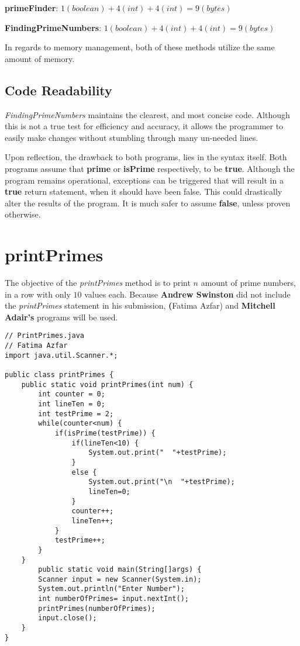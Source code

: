 \documentclass[12pt]{article}
\begin{document}
\textbf{primeFinder}: $1 (boolean)  + 4 (int) + 4 (int)  =  9(bytes)$

\textbf{FindingPrimeNumbers}: $1 (boolean) + 4 (int) + 4(int) = 9(bytes)$ 
 
 
In regards to memory management, both of these methods utilize the same amount of memory. 

\subsection{Code Readability}
\textit{FindingPrimeNumbers} maintains the clearest, and most concise code.  Although this is not a true test for efficiency and accuracy, it allows the programmer to easily make changes without stumbling through many un-needed lines. 

Upon reflection, the drawback to both programs, lies in the syntax itself.  Both programs assume that \textbf{prime} or \textbf{isPrime} respectively, to be \textbf{true}.  Although the program remains operational, exceptions can be triggered that will result in a \textbf{true} return statement, when it should have been false.  This could drastically alter the results of the program.  It is much safer to assume \textbf{false}, unless proven otherwise.

\section{printPrimes}
The objective of the \textit{printPrimes} method is to print $n$ amount of prime numbers, in a row with only $10$ values each.  Because \textbf{Andrew Swinston} did not include the \textit{printPrimes} statement in his submission, \textbf(Fatima Azfar) and \textbf{Mitchell Adair's} programs will be used. 

\begin{lstlisting}
// PrintPrimes.java
// Fatima Azfar
import java.util.Scanner.*; 

public class printPrimes {
	public static void printPrimes(int num) {
		int counter = 0;
		int lineTen = 0;
		int testPrime = 2;
		while(counter<num) {
			if(isPrime(testPrime)) {
				if(lineTen<10) {
					System.out.print("  "+testPrime);		
				}
				else {
					System.out.print("\n  "+testPrime);
					lineTen=0;
				}
				counter++;
				lineTen++;
			}			
			testPrime++;
		}
	}
		public static void main(String[]args) {
		Scanner input = new Scanner(System.in);
		System.out.println("Enter Number");
		int numberOfPrimes= input.nextInt();
		printPrimes(numberOfPrimes);
		input.close();
	}
}
\end{lstlisting}
\end{document}
